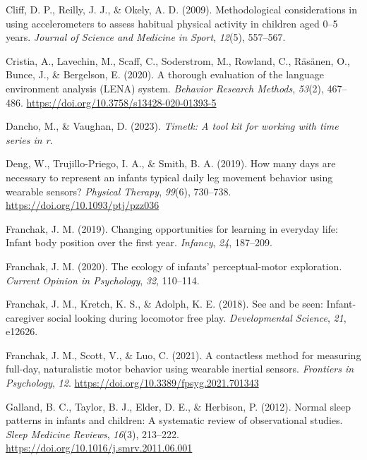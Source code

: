 \documentclass[
  man]{apa6}
\newlength{\cslhangindent}
\newlength{\cslentryspacingunit} %
\newenvironment{CSLReferences}[2] %
 {%
  \setlength{\parindent}{0pt}
  \ifodd #1
  \let\oldpar\par
  \def\par{\hangindent=\cslhangindent\oldpar}
  \fi
  \setlength{\parskip}{#2\cslentryspacingunit}
 }%
 {}
\begin{document}
\begin{CSLReferences}{1}{0}
\leavevmode{}%
Cliff, D. P., Reilly, J. J., \& Okely, A. D. (2009). Methodological considerations in using accelerometers to assess habitual physical activity in children aged 0--5 years. \emph{Journal of Science and Medicine in Sport}, \emph{12}(5), 557--567.

\leavevmode{}%
Cristia, A., Lavechin, M., Scaff, C., Soderstrom, M., Rowland, C., Räsänen, O., Bunce, J., \& Bergelson, E. (2020). A thorough evaluation of the language environment analysis ({LENA}) system. \emph{Behavior Research Methods}, \emph{53}(2), 467--486. \url{https://doi.org/10.3758/s13428-020-01393-5}

\leavevmode{}%
Dancho, M., \& Vaughan, D. (2023). \emph{Timetk: A tool kit for working with time series in r}.

\leavevmode{}%
Deng, W., Trujillo-Priego, I. A., \& Smith, B. A. (2019). How many days are necessary to represent an infant{\textquotesingle}s typical daily leg movement behavior using wearable sensors? \emph{Physical Therapy}, \emph{99}(6), 730--738. \url{https://doi.org/10.1093/ptj/pzz036}

\leavevmode{}%
Franchak, J. M. (2019). Changing opportunities for learning in everyday life: Infant body position over the first year. \emph{Infancy}, \emph{24}, 187--209.

\leavevmode{}%
Franchak, J. M. (2020). The ecology of infants' perceptual-motor exploration. \emph{Current Opinion in Psychology}, \emph{32}, 110--114.

\leavevmode{}%
Franchak, J. M., Kretch, K. S., \& Adolph, K. E. (2018). See and be seen: Infant-caregiver social looking during locomotor free play. \emph{Developmental Science}, \emph{21}, e12626.

\leavevmode{}%
Franchak, J. M., Scott, V., \& Luo, C. (2021). A contactless method for measuring full-day, naturalistic motor behavior using wearable inertial sensors. \emph{Frontiers in Psychology}, \emph{12}. \url{https://doi.org/10.3389/fpsyg.2021.701343}

\leavevmode{}%
Galland, B. C., Taylor, B. J., Elder, D. E., \& Herbison, P. (2012). Normal sleep patterns in infants and children: A systematic review of observational studies. \emph{Sleep Medicine Reviews}, \emph{16}(3), 213--222. \url{https://doi.org/10.1016/j.smrv.2011.06.001}


\end{CSLReferences}
\end{document}
